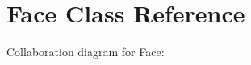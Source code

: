 \hypertarget{classFace}{}\section{Face Class Reference}
\label{classFace}


Collaboration diagram for Face\+:
